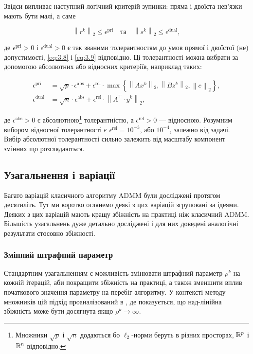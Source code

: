 Звідси випливає наступний логічний критерій зупинки: пряма і двоїста нев'язки мають бути малі, а саме

\begin{equation}
	\label{eq:3.12}
	\left\| r^k \right\|_2 \le \epsilon^{\text{pri}} \quad \text{та} \quad \left\|s^k\right\|_2 \le \epsilon^{\text{dual}},
\end{equation}

де $\epsilon^{\text{pri}} > 0$ і $\epsilon^{\text{dual}} > 0$ є так званими толерантностям до умов прямої і двоїстої (не) допустимості, \eqref{eq:3.8} і \eqref{eq:3.9} відповідно. Ці толерантності можна вибрати за допомогою абсолютних або відносних критеріїв, наприклад таких:

\begin{align}
	\epsilon^{\text{pri}} &= \sqrt{p} \cdot \epsilon^{\text{abs}} + \epsilon^{\text{rel}} \cdot \max \left\{ \left\| A x^k \right\|_2, \left\| B z^k \right\|_2, \left\|c\right\|_2 \right\}, \\
	\epsilon^{\text{dual}} &= \sqrt{n} \cdot \epsilon^{\text{abs}} + \epsilon^{\text{rel}} \cdot \left\| A^\intercal \cdot y^k\right\|_2,
\end{align}

де $\epsilon^{\text{abs}} > 0$ є абсолютною\footnote{Множники $\sqrt{p}$ і $\sqrt{n}$ додаються бо $\ell_2$-норми беруть в різних просторах, $\mathbb{R}^p$ і $\mathbb{R}^n$  відповідно.} толерантністю, а $\epsilon^{\text{rel}} > 0$ --- відносною. Розумним вибором відносної толерантності є $\epsilon^{\text{rel}} = 10^{-3}$, або $10^{-4}$, залежно від задачі. Вибір абсолютної толерантності сильно залежить від масштабу компонент змінних що розглядаються.

\subsection{Узагальнення і варіації}

Багато варіацій класичного алгоритму ADMM були досліджені протягом десятиліть. Тут ми коротко оглянемо деякі з цих варіацій згруповані за ідеями. Деяких з цих варіацій мають кращу збіжність на практиці ніж класичний ADMM. Більшість узагальнень дуже детально досліджені і для них доведені аналогічні результати стосовно збіжності.

\subsubsection{Змінний штрафний параметр}

Стандартним узагальненням є можливість змінювати штрафний параметр $\rho^k$ на кожній ітерацій, аби покращити збіжність на практиці, а також зменшити вплив початкового значення параметру на перебіг алгоритму. У контексті методу множників цій підхід проаналізований в \cite{142}, де показується, що над-лінійна збіжність може бути досягнута якщо $\rho^k \to \infty$. \medskip

